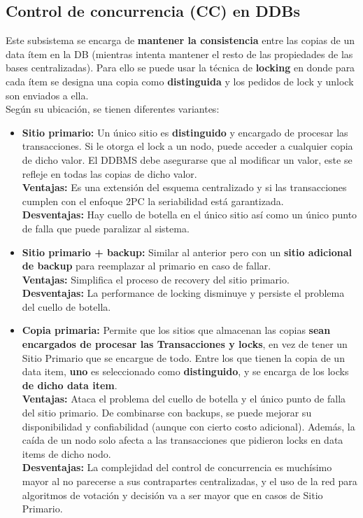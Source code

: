 \subsection*{Control de concurrencia (CC) en DDBs}
Este subsistema se encarga de \textbf{mantener la consistencia} entre las copias de un data ítem en la DB (mientras intenta mantener el resto de las propiedades de las bases centralizadas). Para ello se puede usar la técnica de \textbf{locking} en donde para cada ítem se designa una copia como \textbf{distinguida} y los pedidos de lock y unlock son enviados a ella. \\
Según su ubicación, se tienen diferentes variantes:
\begin{itemize}
    \item \textbf{Sitio primario:} Un  único sitio es \textbf{distinguido} y encargado de procesar las transacciones. Si le otorga el lock a un nodo, puede acceder a cualquier copia de dicho valor. El DDBMS debe asegurarse que al modificar un valor, este se refleje en todas las copias  de dicho valor. \\
    \textbf{Ventajas:} Es una extensión del esquema centralizado y si las transacciones cumplen con el enfoque 2PC la seriabilidad está garantizada. \\
    \textbf{Desventajas:} Hay cuello de botella en el único sitio así como un único punto de falla que puede paralizar al sistema.
    \item \textbf{Sitio primario + backup:} Similar al anterior pero con un \textbf{sitio adicional de backup} para reemplazar al primario en caso de fallar. \\
    \textbf{Ventajas:} Simplifica el proceso de recovery del sitio primario. \\
    \textbf{Desventajas:} La performance de locking disminuye y persiste el problema del cuello de botella.
    \item \textbf{Copia primaria:} Permite que los sitios que almacenan las copias \textbf{sean encargados de procesar las Transacciones y locks}, en vez de tener un Sitio Primario que se encargue de todo. Entre los que tienen la copia de un data item, \textbf{uno} es seleccionado como \textbf{distinguido}, y se encarga de los locks \textbf{de dicho data item}. \\
    \textbf{Ventajas:} Ataca el problema del cuello de botella y el único punto de falla del sitio primario. De combinarse con backups, se puede mejorar su disponibilidad y confiabilidad (aunque con cierto costo adicional). Además, la caída de un nodo solo afecta a las transacciones que pidieron locks en data items de dicho nodo.\\
    \textbf{Desventajas:} La complejidad del control de concurrencia es muchísimo mayor al no parecerse a sus contrapartes centralizadas, y el uso de la red para algoritmos de votación y decisión va a ser mayor que en casos de Sitio Primario.
\end{itemize}


